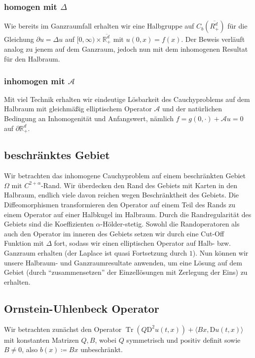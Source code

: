 \documentclass[11pt,a4paper]{scrartcl}
\newcommand{\R}{\mathbb{R}} %
\newcommand{\A}{\mathcal{A}}
\theoremstyle{plain}
\theoremstyle{definition}
\theoremstyle{remark}
\DeclareMathOperator{\Tr}{Tr}
\begin{document}
\subsubsection{homogen mit $\Delta$}

Wie bereits im Ganzraumfall erhalten wir eine Halbgruppe auf $C_b(\overline{R^d_+})$ für die Gleichung $\partial u = \Delta u$ auf $[0,\infty) \times \overline{\R^d_+}$ mit $u(0,x)=f(x)$. Der Beweis verläuft analog zu jenem auf dem Ganzraum, jedoch nun mit dem inhomogenen Resultat für den Halbraum.

\subsubsection{inhomogen mit $\A$}

Mit viel Technik erhalten wir eindeutige Lösbarkeit des Cauchyproblems auf dem Halbraum mit gleichmäßig elliptischem Operator $\A$ und der natürlichen Bedingung an Inhomogenität und Anfangswert, nämlich $f=g(0,\cdot) + \A u=0$ auf $\partial \R^d_+$.

\subsection{beschränktes Gebiet}

Wir betrachten das inhomogene Cauchyproblem auf einem beschränkten Gebiet $\Omega$ mit $C^{2+\alpha}$-Rand. Wir überdecken den Rand des Gebiets mit Karten in den Halbraum, endlich viele davon reichen wegen Beschränktheit des Gebiets. Die Diffeomorphismen transformieren den Operator auf einem Teil des Rands zu einem Operator auf einer Halbkugel im Halbraum. Durch die Randregularität des Gebiets sind die Koeffizienten $\alpha$-Hölder-stetig. Sowohl die Randoperatoren als auch den Operator im inneren des Gebiets setzen wir durch eine Cut-Off Funktion mit $\Delta$ fort, sodass wir einen elliptischen Operator auf Halb- bzw. Ganzraum erhalten (der Laplace ist quasi Fortsetzung durch $1$). Nun können wir unsere Halbraum- und Ganzraumresultate anwenden, um eine Lösung auf dem Gebiet (durch \enquote{zusammensetzen} der Einzellösungen mit Zerlegung der Eins) zu erhalten.

\subsection{Ornstein-Uhlenbeck Operator}

Wir betrachten zunächst den Operator $\Tr(Q\mathrm{D}^2 u(t,x))+\langle Bx, \mathrm{D}u(t,x)\rangle$ mit konstanten Matrizen $Q,B$, wobei $Q$ symmetrisch und positiv definit sowie $B\neq 0$, also $b(x)\coloneqq Bx$ unbeschränkt.
\end{document}
